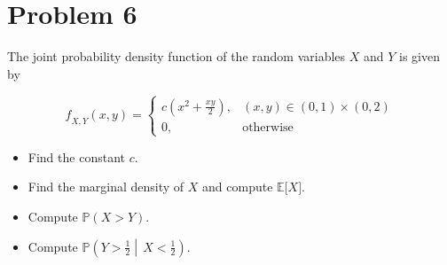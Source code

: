 \section{Problem 6}\label{hw03-problem-6}

The joint probability density function of the random variables \(\mathit{X}\) and \(\mathit{Y}\) is given by

\[\mathit{f}_{\mathit{X},\mathit{Y}}(\mathit{x},\mathit{y}) = \left\{ \begin{matrix}
{\mathit{c}\left( {\mathit{x}^{2} + \frac{\mathit{x}\mathit{y}}{2}} \right),} & {(\mathit{x},\mathit{y}) \in (0,1) \times (0,2)} \\
{0,} & \text{otherwise}
\end{matrix} \right.\]

\begin{itemize}
\item
  Find the constant \(\mathit{c}\).
\item
  Find the marginal density of \(\mathit{X}\) and compute \(\mathbb{E}\lbrack\mathit{X}\rbrack\).
\item
  Compute \(\mathbb{P}(\mathit{X} > \mathit{Y})\).
\item
  Compute \(\mathbb{P}\left( \mathit{Y} > \frac{1}{2} \middle| \,\mathit{X} < \frac{1}{2} \right)\).
\end{itemize}

